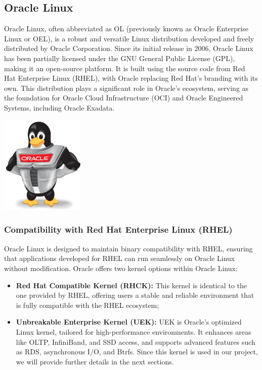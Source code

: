 \subsection{Oracle Linux}
Oracle Linux, often abbreviated as OL (previously known as Oracle Enterprise Linux or OEL), is a robust and versatile Linux distribution developed and freely distributed by Oracle Corporation. Since its initial release in 2006, Oracle Linux has been partially licensed under the GNU General Public License (GPL), making it an open-source platform. It is built using the source code from Red Hat Enterprise Linux (RHEL), with Oracle replacing Red Hat's branding with its own. This distribution plays a significant role in Oracle's ecosystem, serving as the foundation for Oracle Cloud Infrastructure (OCI) and Oracle Engineered Systems, including Oracle Exadata.
\begin{center}
    \centering
    \includegraphics[width=0.3\textwidth]{Images/Oracle Linux.png}
     \cite{OL-logo}
    \label{fig:walt}
\end{center}

\subsubsection[Compatibility with Red Hat Enterprise Linux (RHEL)]{Compatibility with Red Hat Enterprise Linux (RHEL)}
Oracle Linux is designed to maintain binary compatibility with RHEL, ensuring that applications developed for RHEL can run seamlessly on Oracle Linux without modification. Oracle offers two kernel options within Oracle Linux:
\begin{itemize}
    \item \textbf{Red Hat Compatible Kernel (RHCK):} This kernel is identical to the one provided by RHEL, offering users a stable and reliable environment that is fully compatible with the RHEL ecosystem;
    \item \textbf{Unbreakable Enterprise Kernel (UEK):} UEK is Oracle's optimized Linux kernel, tailored for high-performance environments. It enhances areas like OLTP, InfiniBand, and SSD access, and supports advanced features such as RDS, asynchronous I/O, and Btrfs. Since this kernel is used in our project, we will provide further details in the next sections.
\end{itemize}

